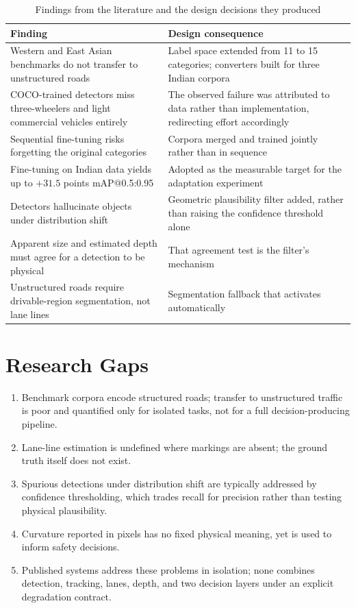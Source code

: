 \documentclass[11pt,a4paper]{report}
\begin{document}
\begin{table}[t]
\caption{Findings from the literature and the design decisions they produced}
\label{tab:litmap}
\small
\begin{tabular}{p{}p{}}
\toprule
\textbf{Finding} & \textbf{Design consequence} \\
\midrule
Western and East Asian benchmarks do not transfer to unstructured roads
  & Label space extended from 11 to 15 categories; converters built for three
    Indian corpora \\
\addlinespace
COCO-trained detectors miss three-wheelers and light commercial vehicles
entirely
  & The observed failure was attributed to data rather than implementation,
    redirecting effort accordingly \\
\addlinespace
Sequential fine-tuning risks forgetting the original categories
  & Corpora merged and trained jointly rather than in sequence \\
\addlinespace
Fine-tuning on Indian data yields up to $+31.5$ points mAP@0.5:0.95
  & Adopted as the measurable target for the adaptation experiment \\
\addlinespace
Detectors hallucinate objects under distribution shift
  & Geometric plausibility filter added, rather than raising the confidence
    threshold alone \\
\addlinespace
Apparent size and estimated depth must agree for a detection to be physical
  & That agreement test is the filter's mechanism \\
\addlinespace
Unstructured roads require drivable-region segmentation, not lane lines
  & Segmentation fallback that activates automatically \\
\bottomrule
\end{tabular}
\end{table}

\section{Research Gaps}

\begin{enumerate}[leftmargin=1.6em,itemsep=3pt]
  \item Benchmark corpora encode structured roads; transfer to unstructured
        traffic is poor and quantified only for isolated tasks, not for a full
        decision-producing pipeline.
  \item Lane-line estimation is undefined where markings are absent; the ground
        truth itself does not exist.
  \item Spurious detections under distribution shift are typically addressed by
        confidence thresholding, which trades recall for precision rather than
        testing physical plausibility.
  \item Curvature reported in pixels has no fixed physical meaning, yet is used
        to inform safety decisions.
  \item Published systems address these problems in isolation; none combines
        detection, tracking, lanes, depth, and two decision layers under an
        explicit degradation contract.
\end{enumerate}
\end{document}
